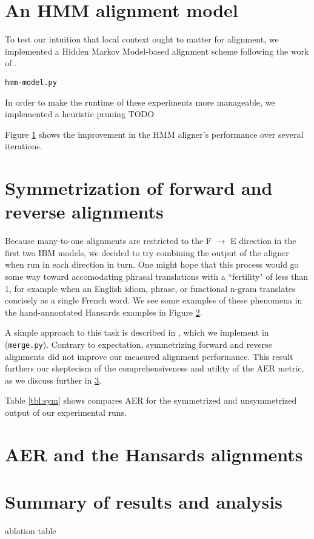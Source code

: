 \documentclass{article}
\begin{document}
\section{An HMM alignment model}

To test our intuition that local context ought to matter for alignment, we implemented a Hidden Markov Model-based alignment scheme following the work of \cite{todo}.

{\tt hmm-model.py}

In order to make the runtime of these experiments more manageable, we implemented a heuristic pruning TODO


Figure \ref{fig:hmm_learning_curve} shows the improvement in the HMM aligner's performance over several iterations.

\begin{figure}
\begin{center}
\end{center}
\label{fig:hmm_learning_curve}
\end{figure}

\section{Symmetrization of forward and reverse alignments}

Because many-to-one alignments are restricted to the F $\rightarrow$ E direction in the first two IBM models, we decided to try combining the output of the aligner when run in each direction in turn. One might hope that this process would go some way toward accomodating phrasal translations with a ``fertility" of less than 1, for example when an English idiom, phrase, or functional n-gram translates concisely as a single French word. We see some examples of these phenomena in the hand-annontated Hansards examples in Figure \ref{fig:etof}.

\begin{figure}
\begin{center}
\end{center}
\label{fig:etof}
\end{figure}

A simple approach to this task is described in \cite{koehn}, which we implement in ({\tt merge.py}). Contrary to expectation, symmetrizing forward and reverse alignments did not improve our measured alignment performance. This result furthers our skeptecism of the comprehensiveness and utility of the AER metric, as we discuss further in \ref{aer}.

Table \ref{tbl:sym} shows compares AER for the symmetrized and unsymmetrized output of our experimental runs.

\section{AER and the Hansards alignments}
\label{aer}

\section{Summary of results and analysis}

ablation table
\end{document}
